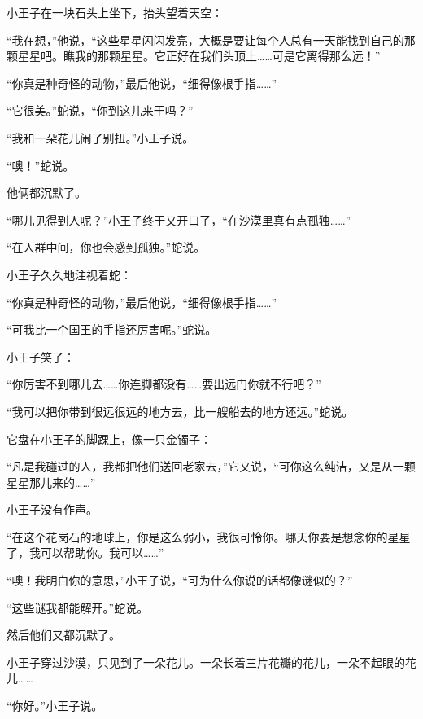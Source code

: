 小王子在一块石头上坐下，抬头望着天空：

“我在想，”他说，“这些星星闪闪发亮，大概是要让每个人总有一天能找到自己的那颗星星吧。瞧我的那颗星星。它正好在我们头顶上\ldots{}\ldots{}可是它离得那么远！”

{\startalignment[center]
 \stopalignment}

“你真是种奇怪的动物，”最后他说，“细得像根手指\ldots{}\ldots{}”

“它很美。”蛇说，“你到这儿来干吗？”

“我和一朵花儿闹了别扭。”小王子说。

“噢！”蛇说。

他俩都沉默了。

“哪儿见得到人呢？”小王子终于又开口了，“在沙漠里真有点孤独\ldots{}\ldots{}”

“在人群中间，你也会感到孤独。”蛇说。

小王子久久地注视着蛇：

“你真是种奇怪的动物，”最后他说，“细得像根手指\ldots{}\ldots{}”

“可我比一个国王的手指还厉害呢。”蛇说。

小王子笑了：

“你厉害不到哪儿去\ldots{}\ldots{}你连脚都没有\ldots{}\ldots{}要出远门你就不行吧？”

“我可以把你带到很远很远的地方去，比一艘船去的地方还远。”蛇说。

它盘在小王子的脚踝上，像一只金镯子：

“凡是我碰过的人，我都把他们送回老家去，”它又说，“可你这么纯洁，又是从一颗星星那儿来的\ldots{}\ldots{}”

小王子没有作声。

“在这个花岗石的地球上，你是这么弱小，我很可怜你。哪天你要是想念你的星星了，我可以帮助你。我可以\ldots{}\ldots{}”

“噢！我明白你的意思，”小王子说，“可为什么你说的话都像谜似的？”

“这些谜我都能解开。”蛇说。

然后他们又都沉默了。


\stoptitle

\starttitle[title={18},reference={part0020.html_a021}]

小王子穿过沙漠，只见到了一朵花儿。一朵长着三片花瓣的花儿，一朵不起眼的花儿\ldots{}\ldots{}

“你好。”小王子说。

